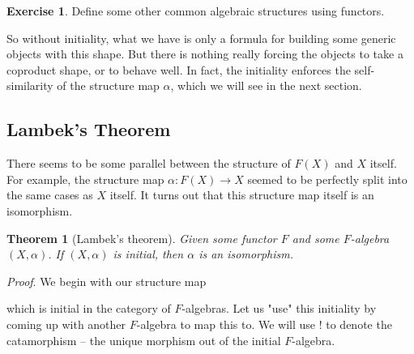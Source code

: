 \documentclass{article}
\theoremstyle{plain}
\newtheorem{theorem}{Theorem}
\theoremstyle{definition}
\newtheorem{exercise}{Exercise}
\begin{document}
\begin{exercise}
Define some other common algebraic structures using functors.
\end{exercise}


So without initiality, what we have is only a formula for building some generic objects with this shape. But there is nothing really forcing the objects to take a coproduct shape, or to behave well. In fact, the initiality enforces the self-similarity of the structure map \ensuremath{\alpha}, which we will see in the next section.

\subsection{Lambek's Theorem}


There seems to be some parallel between the structure of \ensuremath{F\left( X \right)} and \ensuremath{X} itself. For example, the structure map \ensuremath{\alpha : F\left( X \right) \rightarrow X} seemed to be perfectly split into the same cases as \ensuremath{X} itself. It turns out that this structure map itself is an isomorphism.

\begin{theorem}[Lambek's theorem]
 Given some functor \ensuremath{F} and some \ensuremath{F}-algebra \ensuremath{\left( X, \alpha \right)}. If \ensuremath{\left( X, \alpha \right)} is initial, then \ensuremath{\alpha} is an isomorphism. 
\end{theorem}
\label{lambekTheorem} 

\emph{Proof}.  We begin with our structure map


\begin{center}
\end{center}


which is initial in the category of \ensuremath{F}-algebras. Let us "use" this initiality by coming up with another \ensuremath{F}-algebra to map this to. We will use \ensuremath{!} to denote the catamorphism -- the unique morphism out of the initial \ensuremath{F}-algebra.


\begin{center}
\end{center}
\end{document}
